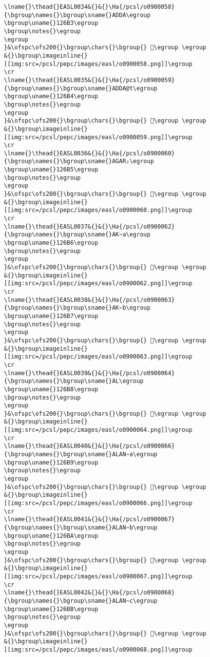 \begin{verbatim}
\lname{}\thead{}EASL0034&{}&{}\Ha{/pcsl/o0900058}{\bgroup\names{}\bgroup\sname{}ADDA\egroup
\bgroup\uname{}126B3\egroup
\bgroup\notes{}\egroup
\egroup
}&\ofspc\ofs200{}\bgroup\chars{}\bgroup{} 𒚳\egroup \egroup
&{}\bgroup\imageinline{}[[img:src=/pcsl/pepc/images/easl/o0900058.png]]\egroup
\cr
\lname{}\thead{}EASL0035&{}&{}\Ha{/pcsl/o0900059}{\bgroup\names{}\bgroup\sname{}ADDA@t\egroup
\bgroup\uname{}126B4\egroup
\bgroup\notes{}\egroup
\egroup
}&\ofspc\ofs200{}\bgroup\chars{}\bgroup{} 𒚴\egroup \egroup
&{}\bgroup\imageinline{}[[img:src=/pcsl/pepc/images/easl/o0900059.png]]\egroup
\cr
\lname{}\thead{}EASL0036&{}&{}\Ha{/pcsl/o0900060}{\bgroup\names{}\bgroup\sname{}AGAR₂\egroup
\bgroup\uname{}126B5\egroup
\bgroup\notes{}\egroup
\egroup
}&\ofspc\ofs200{}\bgroup\chars{}\bgroup{} 𒚵\egroup \egroup
&{}\bgroup\imageinline{}[[img:src=/pcsl/pepc/images/easl/o0900060.png]]\egroup
\cr
\lname{}\thead{}EASL0037&{}&{}\Ha{/pcsl/o0900062}{\bgroup\names{}\bgroup\sname{}AK∼a\egroup
\bgroup\uname{}126B6\egroup
\bgroup\notes{}\egroup
\egroup
}&\ofspc\ofs200{}\bgroup\chars{}\bgroup{} 𒚶\egroup \egroup
&{}\bgroup\imageinline{}[[img:src=/pcsl/pepc/images/easl/o0900062.png]]\egroup
\cr
\lname{}\thead{}EASL0038&{}&{}\Ha{/pcsl/o0900063}{\bgroup\names{}\bgroup\sname{}AK∼b\egroup
\bgroup\uname{}126B7\egroup
\bgroup\notes{}\egroup
\egroup
}&\ofspc\ofs200{}\bgroup\chars{}\bgroup{} 𒚷\egroup \egroup
&{}\bgroup\imageinline{}[[img:src=/pcsl/pepc/images/easl/o0900063.png]]\egroup
\cr
\lname{}\thead{}EASL0039&{}&{}\Ha{/pcsl/o0900064}{\bgroup\names{}\bgroup\sname{}AL\egroup
\bgroup\uname{}126B8\egroup
\bgroup\notes{}\egroup
\egroup
}&\ofspc\ofs200{}\bgroup\chars{}\bgroup{} 𒚸\egroup \egroup
&{}\bgroup\imageinline{}[[img:src=/pcsl/pepc/images/easl/o0900064.png]]\egroup
\cr
\lname{}\thead{}EASL0040&{}&{}\Ha{/pcsl/o0900066}{\bgroup\names{}\bgroup\sname{}ALAN∼a\egroup
\bgroup\uname{}126B9\egroup
\bgroup\notes{}\egroup
\egroup
}&\ofspc\ofs200{}\bgroup\chars{}\bgroup{} 𒚹\egroup \egroup
&{}\bgroup\imageinline{}[[img:src=/pcsl/pepc/images/easl/o0900066.png]]\egroup
\cr
\lname{}\thead{}EASL0041&{}&{}\Ha{/pcsl/o0900067}{\bgroup\names{}\bgroup\sname{}ALAN∼b\egroup
\bgroup\uname{}126BA\egroup
\bgroup\notes{}\egroup
\egroup
}&\ofspc\ofs200{}\bgroup\chars{}\bgroup{} 𒚺\egroup \egroup
&{}\bgroup\imageinline{}[[img:src=/pcsl/pepc/images/easl/o0900067.png]]\egroup
\cr
\lname{}\thead{}EASL0042&{}&{}\Ha{/pcsl/o0900068}{\bgroup\names{}\bgroup\sname{}ALAN∼c\egroup
\bgroup\uname{}126BB\egroup
\bgroup\notes{}\egroup
\egroup
}&\ofspc\ofs200{}\bgroup\chars{}\bgroup{} 𒚻\egroup \egroup
&{}\bgroup\imageinline{}[[img:src=/pcsl/pepc/images/easl/o0900068.png]]\egroup

\end{verbatim}
